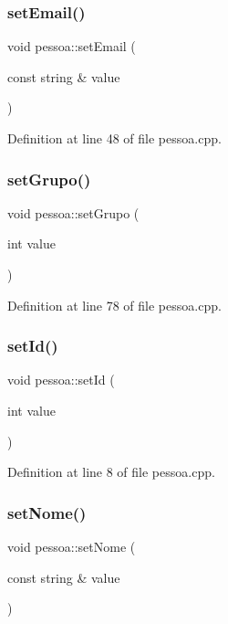 \subsubsection{\texorpdfstring{set\+Email()}{setEmail()}}
{\footnotesize\ttfamily void pessoa\+::set\+Email (\begin{DoxyParamCaption}\item[{const string \&}]{value }\end{DoxyParamCaption})}



Definition at line 48 of file pessoa.\+cpp.

\hypertarget{classpessoa_abde4772449869bd2c8e5e6d280e4f9f5}{}\label{classpessoa_abde4772449869bd2c8e5e6d280e4f9f5} 
\subsubsection{\texorpdfstring{set\+Grupo()}{setGrupo()}}
{\footnotesize\ttfamily void pessoa\+::set\+Grupo (\begin{DoxyParamCaption}\item[{int}]{value }\end{DoxyParamCaption})}



Definition at line 78 of file pessoa.\+cpp.

\hypertarget{classpessoa_ab528a41c403719b847f8e43c0893e14c}{}\label{classpessoa_ab528a41c403719b847f8e43c0893e14c} 
\subsubsection{\texorpdfstring{set\+Id()}{setId()}}
{\footnotesize\ttfamily void pessoa\+::set\+Id (\begin{DoxyParamCaption}\item[{int}]{value }\end{DoxyParamCaption})}



Definition at line 8 of file pessoa.\+cpp.

\hypertarget{classpessoa_a5e7a713ac30be9101a9d3d59848269e1}{}\label{classpessoa_a5e7a713ac30be9101a9d3d59848269e1} 
\subsubsection{\texorpdfstring{set\+Nome()}{setNome()}}
{\footnotesize\ttfamily void pessoa\+::set\+Nome (\begin{DoxyParamCaption}\item[{const string \&}]{value }\end{DoxyParamCaption})}



